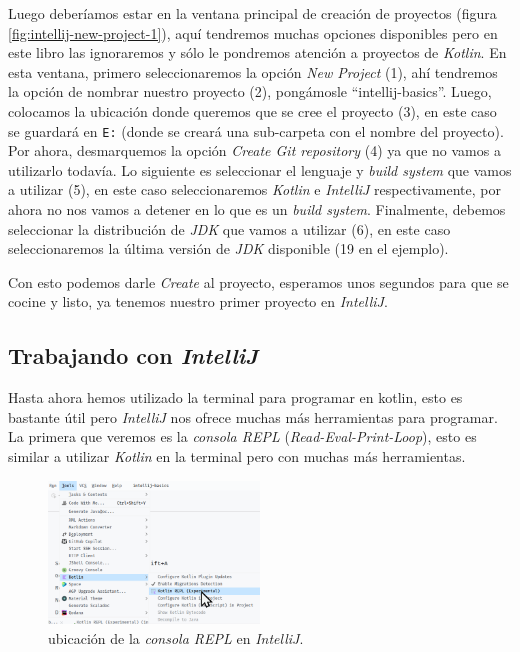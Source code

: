     Luego deberíamos estar en la ventana principal de creación de proyectos (figura 
    \ref{fig:intellij-new-project-1}), aquí tendremos muchas opciones disponibles pero en este
    libro las ignoraremos y sólo le pondremos atención a proyectos de \textit{Kotlin}.
    En esta ventana, primero seleccionaremos la opción \textit{New Project} (1), ahí tendremos la
    opción de nombrar nuestro proyecto (2), pongámosle \enquote{intellij-basics}.
    Luego, colocamos la ubicación donde queremos que se cree el proyecto (3), en este caso se 
    guardará en \texttt{E:\Code\Teaching} (donde se creará una sub-carpeta con el nombre
    del proyecto).
    Por ahora, desmarquemos la opción \textit{Create Git repository} (4) ya que no vamos a 
    utilizarlo todavía.
    Lo siguiente es seleccionar el lenguaje y \textit{build system} que vamos a utilizar (5), en
    este caso seleccionaremos \textit{Kotlin} e \textit{IntelliJ} respectivamente, por ahora no nos
    vamos a detener en lo que es un \textit{build system}.
    Finalmente, debemos seleccionar la distribución de \textit{JDK} que vamos a utilizar (6), en
    este caso seleccionaremos la última versión de \textit{JDK} disponible (19 en el ejemplo).

    Con esto podemos darle \textit{Create} al proyecto, esperamos unos segundos para que se cocine
    y listo, ya tenemos nuestro primer proyecto en \textit{IntelliJ}.

  \subsection{Trabajando con \textit{IntelliJ}}
    \label{sec:intellij-work}

    Hasta ahora hemos utilizado la terminal para programar en kotlin, esto es bastante útil pero
    \textit{IntelliJ} nos ofrece muchas más herramientas para programar.
    La primera que veremos es la \textit{consola REPL} (\textit{Read-Eval-Print-Loop}), esto es
    similar a utilizar \textit{Kotlin} en la terminal pero con muchas más herramientas.

    \begin{figure}[ht!]
      \centering
      \includegraphics[width=0.5\textwidth]{img/Por_algo_se_empieza/idea64_tools_repl.png}
      \caption{ubicación de la \textit{consola REPL} en \textit{IntelliJ}.}
      \label{fig:tools-repl}
    \end{figure}

